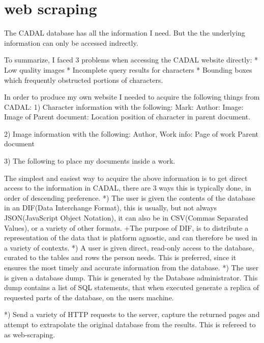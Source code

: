 \chapter{web scraping}

The CADAL database has all the information I need.  But the the underlying information can only be accessed indrectly.

    To summarize, I faced 3 problems when accessing the CADAL website directly:
        *  Low quality images
        *  Incomplete query results for characters
        *  Bounding boxes which frequently obstructed portions of characters.
                   



    In order to produce my own website I needed to acquire the following things from CADAL:
        1)  Character information with the following:
            Mark:
            Author:
            Image:
            Image of Parent document:
            Location position of character in parent document.
        
        2)  Image information with the following:
            Author,
            Work info:
                Page of work
                Parent document
            
        3)    The following to place my documents inside a work.
                
            The simplest and easiest way to acquire the above information is to get direct access to the information in CADAL, there are 3 ways this is typically done, in order of descending preference.
            *)  The user is given the contents of the database in an DIF(Data Interchange Format), this is usually, but not always JSON(JavaScript Object Notation), it can also be in CSV(Commas Separated Values), or a variety of other formats.
                +The purpose of DIF, is to distribute a representation of the data that is platform agnostic, and can  therefore be used in a variety of contexts.
            *)  A user is given direct, read-only access to the database, curated to the tables and rows the person needs.  This is preferred, since it ensures the most timely and accurate information from the database.
            *)  The user is given a database dump.  This is generated by the Database administrator.  This dump contains a list of SQL statements, that when executed generate a replica of requested parts of the database, on the users machine.

            *)  Send a variety of HTTP requests to the server, capture the returned pages and attempt to extrapolate the original database from the results.  This is refereed to as web-scraping.
            
